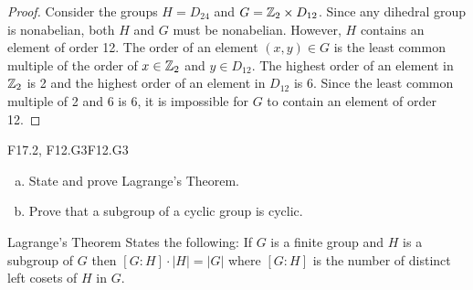 \documentclass[../AlgebraQualSolutions.tex]{subfiles}
\begin{document}
\begin{proof}
	Consider the groups $H = D_{24}$ and $G = \mathbb{Z}_2 \times D_{12}$. Since any dihedral group is nonabelian, both $H$ and $G$ must be nonabelian. However, $H$ contains an element of order 12. The order of an element $(x,y) \in G$ is the least common multiple of the order of $x \in \mathbb{Z}_2$ and $y \in D_{12}$. The highest order of an element in $\mathbb{Z}_2$ is 2 and the highest order of an element in $D_{12}$ is 6. Since the least common multiple of 2 and 6 is 6, it is impossible for $G$ to contain an element of order 12.
\end{proof}

	\begin{prob}{F17.2, F12.G3}{F12.G3}
	\begin{enumerate}[(a)]
	\item State and prove Lagrange's Theorem.
	\item Prove that a subgroup of a cyclic group is cyclic.
	\end{enumerate}
	\end{prob}
	
	Lagrange's Theorem States the following: If $G$ is a finite group and $H$ is a subgroup of $G$ then $[G:H]\cdot|H| = |G|$ where $[G:H]$ is the number of distinct left cosets of $H$ in $G$.
\end{document}
